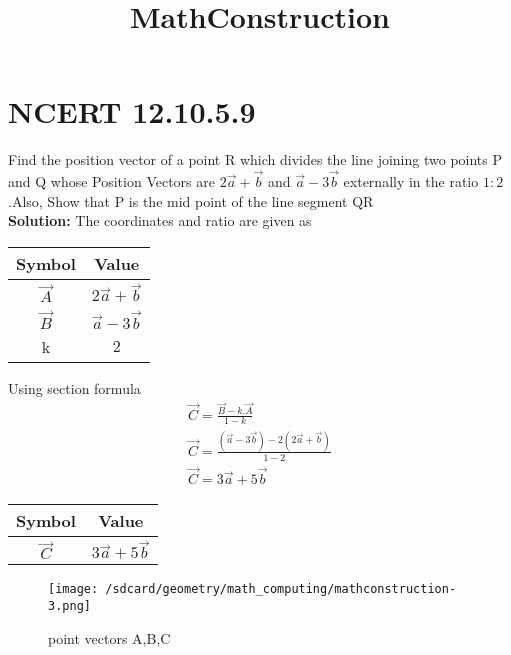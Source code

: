 \documentclass{article}
\title{MathConstruction}
\begin{document}
\section{NCERT 12.10.5.9}

Find the position vector of a point R which divides the line joining two points P and Q whose Position Vectors are $2\vec{a}+\vec{b}$ and $\vec{a}-3\vec{b}$ externally in the ratio $1:2$.Also, Show that P is the mid point of the line segment QR  \\
\textbf{Solution:}
The coordinates and ratio are given as
\begin{table}[h]
    \centering
    \begin{tabular}{|c|c|}
        \hline
        \textbf{Symbol} & \textbf{Value} \\
        \hline
        $\vec{A}$ & $2\vec{a}+\vec{b}$ \\
        \hline
        $\vec{B}$ & $\vec{a}-3\vec{b}$ \\
        \hline
        k & $2$ \\
        \hline
    \end{tabular}
    \label{tab:mytable}
\end{table}
Using section formula
\begin{align}
    \vec{C}=\frac{\vec{B}-k.\vec{A}}{1-k}\\
    \vec{C}=\frac{(\vec{a}-3\vec{b})-2(2\vec{a}+\vec{b})}{1-2}\\
    \vec{C}=3\vec{a}+5\vec{b}
\end{align}
\begin{table}[h]
    \centering
    \begin{tabular}{|c|c|}
        \hline
        \textbf{Symbol} & \textbf{Value}  \\
        \hline
        $\vec{C}$ & $3\vec{a}+5\vec{b}$  \\
        \hline
    \end{tabular}
    \label{tab:mytable}
\end{table}
\begin{figure}[!ht]
    \centering
    \texttt{[image: /sdcard/geometry/math\_computing/mathconstruction-3.png]}
    \caption{point vectors A,B,C}
    \label{fig:enter-label}
\end{figure}
\end{document}
